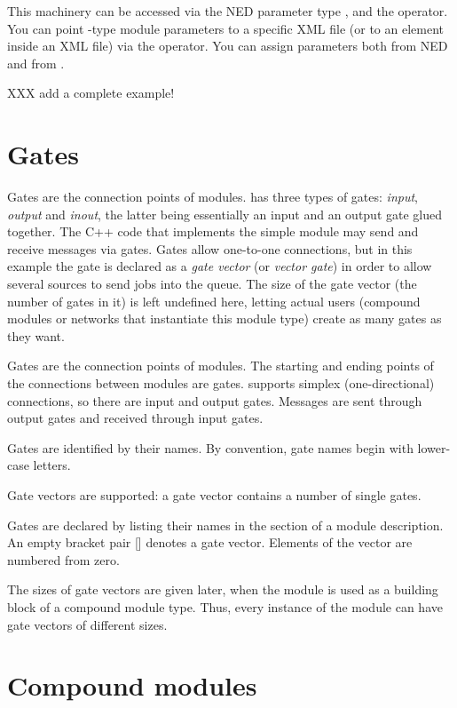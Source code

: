 This machinery can be accessed via the NED parameter type , and the
 operator. You can point -type module parameters
to a specific XML file (or to an element inside an XML file) via the
 operator. You can assign  parameters both from NED
and from .

XXX add a complete example!


\section{Gates}


Gates are the connection points of modules. {\opp} has three types of gates:
\textit{input}, \textit{output} and \textit{inout}, the latter being essentially
an input and an output gate glued together. The C++ code that implements the
simple module may send and receive messages via gates. Gates allow one-to-one
connections, but in this example the  gate is declared as a \textit{gate
vector} (or \textit{vector gate}) in order to allow several sources to send jobs
into the queue. The size of the gate vector (the number of gates in it) is left
undefined here, letting actual users (compound modules or networks that
instantiate this module type) create as many gates as they want.


Gates are the connection points of modules. The starting and
ending points of the connections between modules are gates. {\opp}
supports simplex (one-directional) connections, so there are
input and output gates. Messages are sent through
output gates and received through input gates.

Gates are identified by their names.
By convention, gate names begin with lower-case letters.

Gate vectors are supported: a gate vector
contains a number of single gates.

Gates are declared by listing their names in the
 section of a module description. An
empty bracket pair [] denotes a gate vector.
Elements of the vector are numbered from zero.


The sizes of gate vectors are given later, when the module is used as
a building block of a compound module type. Thus, every instance of
the module can have gate vectors of different sizes.




\section{Compound modules}

